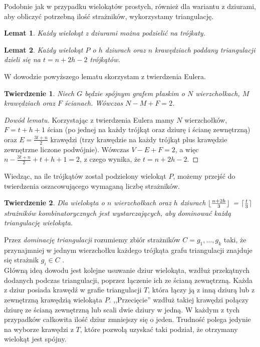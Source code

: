 \documentclass[brudnopis]{xmgr}
\DeclarePairedDelimiter\ceil{\lceil}{\rceil}
\DeclarePairedDelimiter\floor{\lfloor}{\rfloor}
\newtheorem{Twierdzenie}{Twierdzenie}
\newtheorem{Lemat}{Lemat}
\theoremstyle{definition}
\begin{document}
\indent Podobnie jak w przypadku wielokątów prostych, również dla wariantu z dziurami, aby obliczyć potrzebną ilość strażników, wykorzystamy triangulację.

\begin{Lemat} \cite{orourke}
  Każdy wielokąt z dziurami można podzielić na trójkaty.
\end{Lemat}

\begin{Lemat}\label{t trójkątów triangulacja} \cite{orourke}
  Każdy wielokąt $P$ o $h$ dziurach oraz $n$ krawędziach poddany triangulacji dzieli się na $t = n + 2h - 2$ trójkątów.
\end{Lemat}

W dowodzie powyższego lematu skorzystam z twierdzenia Eulera.
\begin{Twierdzenie} \label{tw eulera} \cite{euler}
  Niech $G$ będzie spójnym grafem płaskim o $N$ wierzchołkach, $M$ krawędziach oraz $F$ ścianach. Wówczas $N - M + F = 2$.
\end{Twierdzenie}

\begin{proof}[Dowód lematu]
	Korzystając z twierdzenia Eulera mamy $N$ wierzchołków, $F = t + h + 1$ ścian (po jednej na każdy trójkąt oraz dziurę i ścianę zewnętrzną) oraz $E = \frac{3t+n}{2}$ krawędzi (trzy krawędzie na każdy trójkąt plus krawędzie zewnętrzne liczone podwójnie).  Wówczas $V - E + F = 2$, a więc $n - \frac{3t+n}{2} + t + h + 1 = 2$, z czego wynika, że $t = n + 2h - 2$.
\end{proof}
Wiedząc, na ile trójkątów został podzielony wielokąt $P$, możemy przejść do twierdzenia oszacowującego wymaganą liczbę strażników.

\begin{Twierdzenie} \cite{orourke} \label{dominacjatriangulacji}
  Dla wielokąta o $n$ wierzchołkach oraz $h$ dziurach $\floor{\frac{n+2h}{3}}$ = $\ceil{\frac{t}{3}}$ strażników kombinatorycznych jest wystarczających, aby dominować każdą triangulację wielokąta.
\end{Twierdzenie}

Przez \emph{dominację triangulacji} rozumiemy zbiór strażników $C = {g_1,\ldots,g_k}$ taki, że przynajmniej w jednym wierzchołku każdego trójkąta grafu triangulacji znajduje się strażnik $g_i \in C$ \cite{orourke}. 
\\\indent Główną ideą dowodu jest kolejne usuwanie dziur wielokąta, wzdłuż przekątnych dodanych podczas triangulacji, poprzez łączenie ich ze ścianą zewnętrzną. Każda z dziur posiada krawędź w grafie triangulacji $T$, która łączy ją z inną dziurą lub z zewnętrzną krawędzią wielokąta $P$. ,,Przecięcie'' wzdłuż takiej krawędzi połączy dziurę ze ścianą zewnętrzną lub scali dwie dziury w jedną. W każdym z tych przypadków całkowita ilość dziur zmniejszy się o jeden. Trudność polega jedynie na wyborze krawędzi z $T$, które pozwolą uzyskać taki podział, że otrzymany wielokąt jest spójny.
\end{document}
